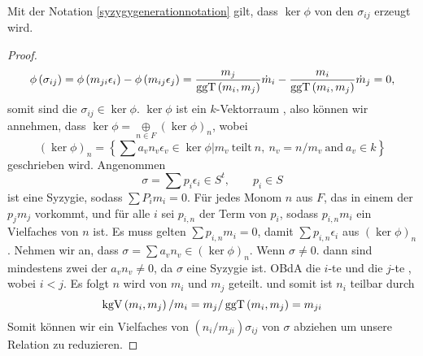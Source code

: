 \documentclass{article}
\begin{document}
	\begin{lem}
		Mit der Notation  \ref{syzygygenerationnotation} gilt,
		dass 
		\( \ker \phi \)
		von den
		\( \sigma_{ij} \)
		erzeugt wird.
		\begin{proof}
			\label{uniquesum}
			\[
				\phi\left( \sigma_{ij} \right) 
				= \phi \left(m_{ji} \epsilon_{i}\right) 
				- \phi \left(  m_{ij} \epsilon_{j}  \right)
				= \frac{m_{j}}{\operatorname{ggT}\left( m_{i} ,m_{j} \right) } \dot m_{i} 
				-\frac{m_{i}}{\operatorname{ggT}\left( m_{i} ,m_{j} \right) } \dot m_{j}
				= 0 ,
			\]
			somit sind die 
			\( \sigma_{ij} \in \ker \phi \).
			\( \ker \phi\)
			ist ein 
			\( k \)-Vektorraum ,
			also k\"onnen wir annehmen, dass 
			\( 
				\ker \phi = 
				\underset{
					n \in F 
				}{
					\oplus
				}
				\left( 
					\ker \phi 
				\right)_{n}  
			\),
			wobei
			\[ 
				\left( \ker \phi \right)_{n} 
				= \left\{ 
					\sum a_{v} n_{v} \epsilon_{v} \in \ker \phi 
					\big| m_{v} \ \text{teilt} \  n, 
					\ n_{v} = n \slash m_{v} 
					\ \text{and} \ a_{v} \in k  
				\right\}
			\]
			geschrieben wird.
			Angenommen
			\[
				\sigma = \sum p_{i} \epsilon_{i} \in S^{t}, \qquad p_{i} \in S
			\]
			ist eine Syzygie,
			sodass
			\( \sum P_{i}m_{i} =0 \).
			F\"ur jedes Monom 
			\( n \)
			aus 
			\(F\),
			das in einem der 
			\( p_{j}m_{j} \)
			vorkommt,
			und f\"ur alle 
			\(i\) 
			sei 
			\( p_{i,n}\)
			der Term von
			\( p_{i} \),
			sodass 
			\( p_{i,n}m_{i} \)
			ein Vielfaches von 
			\( n\)
			ist.
			Es muss gelten
			\( \sum p_{i,n} m_{i}=0 \),
			damit 
			\( \sum p_{i,n} \epsilon_{i} \)
			aus 
			\( \left( \ker \phi \right)_{n}\).
			Nehmen wir an, dass 
			\( \sigma= \sum a_{v} n_{v}
			\in
			\left( \ker \phi \right)_{n} \).
			Wenn 
			\( \sigma \neq 0 \).
			dann sind mindestens zwei der 
			\( a_{v} n_{v} \neq 0 \),
			da 
			\( \sigma \) eine Syzygie ist.
			OBdA die 
			\(i\)-te 
			und die
			\(j\)-te
			, wobei 
			\( i<j \).
			Es folgt 
			\( n \) 
			wird von
			\( m_{i} \)
			und 
			\( m_{j} \) 
			geteilt.
			und somit ist 
			\( n_{i} \)
			teilbar durch
			\[
				\operatorname{kgV}\left( m_{i},m_{j} \right)/m_{i} 
				= m_{j} / \operatorname{ggT}\left( m_{i},m_{j} \right) 
				= m_{ji} 
			\]
			Somit k\"onnen wir ein Vielfaches von 
			\( \left( n_{i}/m_{ji} \right)\sigma_{ij} \)
			von 
			\( \sigma \) 
			abziehen um unsere Relation zu reduzieren.
		\end{proof}
	\end{lem}
\end{document}

